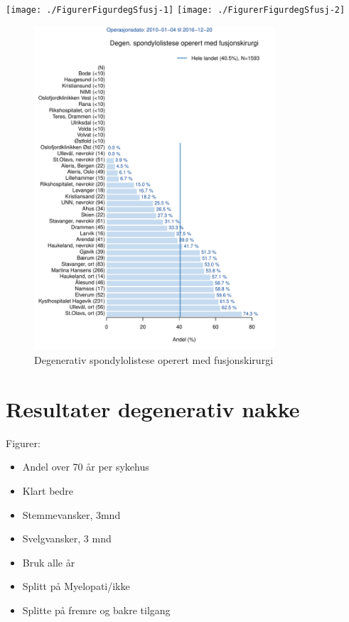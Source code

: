 \documentclass [norsk,a4paper,twoside]{article}\usepackage[]{graphicx}\usepackage[]{color}
\newenvironment{knitrout}{}{} %
\begin{document}
\begin{knitrout}
\color{fgcolor}

{\centering \texttt{[image: ./FigurerFigurdegSfusj-1]} 
\texttt{[image: ./FigurerFigurdegSfusj-2]} 

}



\end{knitrout}

\begin{figure}[ht]
\centering \includegraphics[width= 0.8\textwidth]{FigdegSponFusj.pdf}
\caption{\label{fig:Dura} Degenerativ spondylolistese operert med fusjonskirurgi}
\end{figure}



\clearpage

\section{Resultater degenerativ nakke}
Figurer:
\begin{itemize}
\item Andel over 70 år per sykehus
\item Klart bedre
\item Stemmevansker, 3mnd
\item Svelgvansker, 3 mnd
\item Bruk alle år
\item Splitt på Myelopati/ikke
\item Splitte på fremre og bakre tilgang
\end{itemize}
\end{document}
